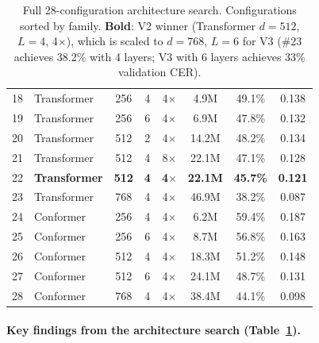 \documentclass[11pt]{article}
\begin{document}
\begin{table}[t]
\begin{tabular}{rlcccccc}
18 & Transformer & 256 & 4 & 4$\times$ & 4.9M & 49.1\% & 0.138 \\
19 & Transformer & 256 & 6 & 4$\times$ & 6.9M & 47.8\% & 0.132 \\
20 & Transformer & 512 & 2 & 4$\times$ & 14.2M & 48.2\% & 0.134 \\
21 & Transformer & 512 & 4 & 8$\times$ & 22.1M & 47.1\% & 0.128 \\
22 & \textbf{Transformer} & \textbf{512} & \textbf{4} & \textbf{4$\times$} & \textbf{22.1M} & \textbf{45.7\%} & \textbf{0.121} \\
23 & Transformer & 768 & 4 & 4$\times$ & 46.9M & 38.2\% & 0.087 \\
\midrule
24 & Conformer & 256 & 4 & 4$\times$ & 6.2M & 59.4\% & 0.187 \\
25 & Conformer & 256 & 6 & 4$\times$ & 8.7M & 56.8\% & 0.163 \\
26 & Conformer & 512 & 4 & 4$\times$ & 18.3M & 51.2\% & 0.148 \\
27 & Conformer & 512 & 6 & 4$\times$ & 24.1M & 48.7\% & 0.131 \\
28 & Conformer & 768 & 4 & 4$\times$ & 38.4M & 44.1\% & 0.098 \\
\bottomrule
\end{tabular}
\caption{Full 28-configuration architecture search. Configurations sorted by family. \textbf{Bold}: V2 winner (Transformer $d{=}512$, $L{=}4$, 4$\times$), which is scaled to $d{=}768$, $L{=}6$ for V3 (\#23 achieves 38.2\% with 4 layers; V3 with 6 layers achieves 33\% validation CER).}
\label{tab:arch-search-full}
\end{table}

\paragraph{Key findings from the architecture search (Table~\ref{tab:arch-search-full}).}
\end{document}
